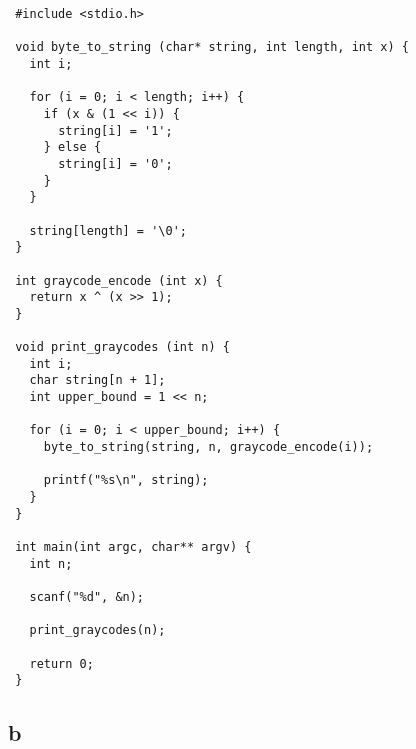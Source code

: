 \documentclass[a4paper,10pt]{article}
\begin{document}
\lstset{language=c}
\begin{lstlisting}
 #include <stdio.h>

 void byte_to_string (char* string, int length, int x) {
   int i;
  
   for (i = 0; i < length; i++) {
     if (x & (1 << i)) {
       string[i] = '1';
     } else {
       string[i] = '0';
     }
   }
  
   string[length] = '\0';
 }

 int graycode_encode (int x) {
   return x ^ (x >> 1);
 }

 void print_graycodes (int n) {
   int i;
   char string[n + 1];
   int upper_bound = 1 << n;
  
   for (i = 0; i < upper_bound; i++) {
     byte_to_string(string, n, graycode_encode(i));
    
     printf("%s\n", string);
   }
 }

 int main(int argc, char** argv) {
   int n;
  
   scanf("%d", &n);
  
   print_graycodes(n);

   return 0;
 }
\end{lstlisting}

\subsection*{b}
\end{document}
